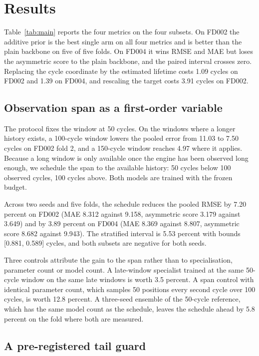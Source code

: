 \section{Results}\label{sec:results}


Table~\ref{tab:main} reports the four metrics on the four subsets. On FD002 the additive prior is the best single arm on all four metrics and is better than the plain backbone on five of five folds. On FD004 it wins RMSE and MAE but loses the asymmetric score to the plain backbone, and the paired interval crosses zero. Replacing the cycle coordinate by the estimated lifetime costs 1.09 cycles on FD002 and 1.39 on FD004, and rescaling the target costs 3.91 cycles on FD002.

\subsection{Observation span as a first-order variable}

The protocol fixes the window at 50 cycles. On the windows where a longer history exists, a 100-cycle window lowers the pooled error from 11.03 to 7.50 cycles on FD002 fold 2, and a 150-cycle window reaches 4.97 where it applies. Because a long window is only available once the engine has been observed long enough, we schedule the span to the available history: 50 cycles below 100 observed cycles, 100 cycles above. Both models are trained with the frozen budget.

Across two seeds and five folds, the schedule reduces the pooled RMSE by 7.20 percent on FD002 (MAE 8.312 against 9.158, asymmetric score 3.179 against 3.649) and by 3.89 percent on FD004 (MAE 8.369 against 8.807, asymmetric score 8.682 against 9.943). The stratified interval is 5.53 percent with bounds [0.881, 0.589] cycles, and both subsets are negative for both seeds.

Three controls attribute the gain to the span rather than to specialisation, parameter count or model count. A late-window specialist trained at the same 50-cycle window on the same late windows is worth 3.5 percent. A span control with identical parameter count, which samples 50 positions every second cycle over 100 cycles, is worth 12.8 percent. A three-seed ensemble of the 50-cycle reference, which has the same model count as the schedule, leaves the schedule ahead by 5.8 percent on the fold where both are measured.

\subsection{A pre-registered tail guard}

